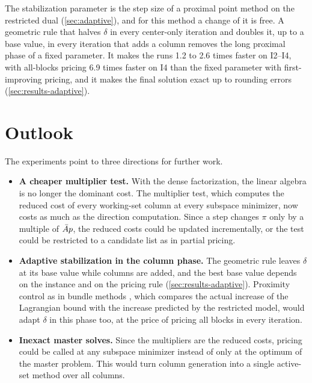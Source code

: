 \medskip

The stabilization parameter is the step size of a proximal point method on the restricted
dual (\cref{sec:adaptive}), and for this method a change of it is free. A geometric rule that
halves $\delta$ in every center-only iteration and doubles it, up to a base value, in every
iteration that adds a column removes the long proximal phase of a fixed parameter. It makes
the runs 1.2 to 2.6 times faster on I2--I4, with all-blocks pricing 6.9 times faster on I4 than
the fixed parameter with first-improving pricing, and it makes the final solution exact up to
rounding errors (\cref{sec:results-adaptive}).


\section{Outlook}

The experiments point to three directions for further work.
\begin{itemize}
    \item \textbf{A cheaper multiplier test.} With the dense factorization, the linear algebra
          is no longer the dominant cost. The multiplier test, which computes the reduced cost of
          every working-set column at every subspace minimizer, now costs as much as the
          direction computation. Since a step changes $\pi$ only by a multiple of $\bar{A} p$, the
          reduced costs could be updated incrementally, or the test could be restricted to a
          candidate list as in partial pricing.
    \item \textbf{Adaptive stabilization in the column phase.} The geometric rule leaves
          $\delta$ at its base value while columns are added, and the best base value depends
          on the instance and on the pricing rule (\cref{sec:results-adaptive}). Proximity
          control as in bundle methods \cite{kiwiel1990proximity}, which compares the actual
          increase of the Lagrangian bound with the increase predicted by the restricted
          model, would adapt $\delta$ in this phase too, at the price of pricing all blocks in
          every iteration.
    \item \textbf{Inexact master solves.} Since the multipliers are the reduced costs, pricing
          could be called at any subspace minimizer instead of only at the optimum of the
          master problem. This would turn column generation into a single active-set method
          over all columns.
\end{itemize}
